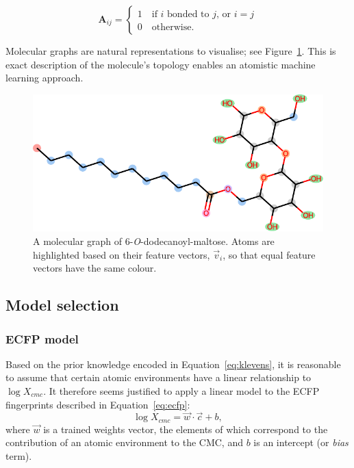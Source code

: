 \begin{equation}
    \label{eq:adjacency-mat}
    \mathbf{A}_{ij} = \begin{cases}
        1 \quad \text{if } i \text { bonded to } j \text{, or } i = j \\
        0 \quad \text{otherwise.}
    \end{cases}
\end{equation}

Molecular graphs are natural representations to visualise; see Figure~\ref{fig:mol-graph}. This is exact description of the molecule's topology enables an atomistic machine learning approach.

\begin{figure}
    \centering
    \includegraphics[width=.8\linewidth]{images/molecular-graph.pdf}
    \caption{A molecular graph of 6-\textit{O}-dodecanoyl-maltose. Atoms are
        highlighted based on their feature vectors, $\vec{v}_i$, so that equal
        feature vectors have the same colour.}
    \label{fig:mol-graph}
\end{figure}

\subsection{Model selection}

\subsubsection{ECFP model}

Based on the prior knowledge encoded in Equation~\ref{eq:klevens}, it is
reasonable to assume that certain atomic environments have a linear relationship to $\log X_{cmc}$. It therefore seems justified to apply a linear model to the ECFP fingerprints described in Equation~\ref{eq:ecfp}:
\begin{equation}
    \label{eq:linear-ecfp}
    \log X_{cmc} = \vec{w} \cdot \vec{c} + b,
\end{equation}
where $\vec{w}$ is a trained weights vector, the elements of which correspond to the contribution of an atomic environment to the CMC, and $b$ is an intercept (or \emph{bias} term).

